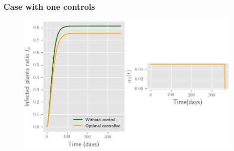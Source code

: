 	\begin{frame}
	\frametitle{Case with one controls}
	\begin{figure}
		\centering	
		\includegraphics[scale=0.5]{Feathergraphics/one_control_simulation_1.eps}
	\end{figure}	
\end{frame}


